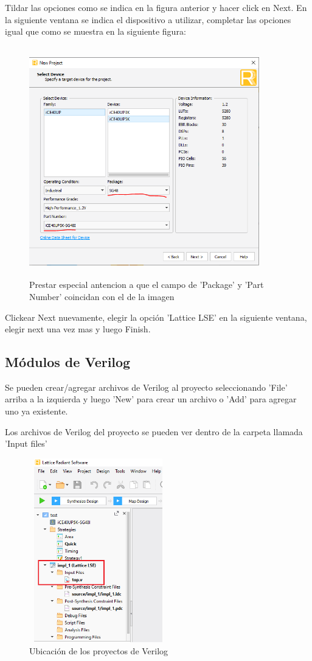\documentclass{article}
\begin{document}
	Tildar las opciones como se indica en la figura anterior y hacer click en Next.
	En la siguiente ventana se indica el dispositivo a utilizar, completar las opciones igual que como se muestra en la siguiente figura:
	\begin{figure}[H]
	\centering
	\includegraphics[height=10cm,width=10cm]{Imagenes/Dispositivo.png}
	\caption{Prestar especial antencion a que el campo de 'Package' y 'Part Number' coincidan con el de la imagen }
	\end{figure}
	Clickear Next nuevamente, elegir la opción 'Lattice LSE' en la siguiente ventana, elegir next una vez mas y luego Finish.
	

\subsection{Módulos de Verilog}
Se pueden crear/agregar archivos de Verilog al proyecto seleccionando 'File' arriba a la izquierda y luego 'New' para crear un archivo o 'Add' para agregar uno ya existente.

Los archivos de Verilog del proyecto se pueden ver dentro de la carpeta llamada 'Input files'
	\begin{figure}[H]
	\centering
	\includegraphics[height=8cm,width=6cm]{Imagenes/VerilogArch.png}
	\caption{Ubicación de los proyectos de Verilog}
	\end{figure}
\end{document}
